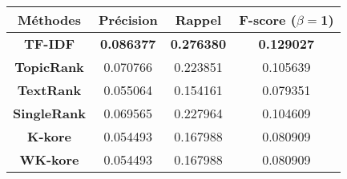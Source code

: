 \begin{tabular}{|c|c|c|c|}
\hline 
\textbf{Méthodes} & \textbf{Précision} & \textbf{Rappel} & \textbf{F-score ($\beta=$1)} \\ 
\hline 
\textbf{TF-IDF} & \textbf{0.086377} & \textbf{0.276380} & \textbf{0.129027} \\ 
\hline 
\textbf{TopicRank} & 0.070766 & 0.223851 & 0.105639 \\ 
\hline 
\textbf{TextRank} & 0.055064 & 0.154161 & 0.079351 \\ 
\hline 
\textbf{SingleRank} & 0.069565 & 0.227964 & 0.104609 \\ 
\hline 
\textbf{K-kore} & 0.054493 & 0.167988 & 0.080909 \\ 
\hline 
\textbf{WK-kore} & 0.054493 & 0.167988 & 0.080909 \\ 
\hline 
\end{tabular}